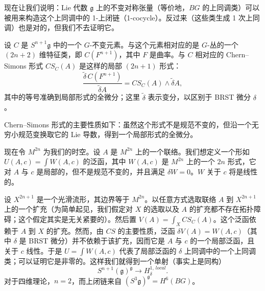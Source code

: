 现在让我们说明：Lie 代数 $\mathfrak g$ 上的不变对称张量（等价地，$BG$ 的上同调类）可以被用来构造这个上同调中的 1-上闭链（1-cocycle）。反过来（这些类生成 1 次上同调）也是对的，但我们不去证明它。

设 $C$ 是 $S^{n+1}\mathfrak g$ 中的一个 $G$-不变元素。与这个元素相对应的是 $G$-丛的一个 $(2n+2)$ 维特征类，即 $C(F^{n+1})$，其中 $F$ 是曲率。与 $C$ 相对应的 Chern–Simons 形式 $CS_C(A)$ 是这样的局部 $(2n+1)$ 形式：
\[
\frac{\widetilde\delta\,C(F^{n+1})}{\widetilde\delta A}=CS_C(A)\wedge\widetilde\delta A,
\]
其中的等号准确到局部形式的全微分；这里 $\widetilde\delta$ 表示变分，以区别于 BRST 微分 $\delta$。

Chern–Simons 形式的主要性质如下：虽然这个形式不是规范不变的，但沿一个无穷小规范变换取它的 Lie 导数，得到一个局部形式的全微分。


现在令 $M^{2n}$ 为我们的时空。设 $A$ 是 $M^{2n}$ 上的一个联络。我们想定义一个形如 $U(A,c)=\int W(A,c)$ 的泛函，其中 $W(A,c)$ 是 $M^{2n}$ 上的一个 $2n$ 形式，它对 $A$ 与 $c$ 是局部的，但不是规范不变的，并且满足 $\delta W=0$。$W$ 关于 $c$ 将是线性的。

设 $X^{2n+1}$ 是一个光滑流形，其边界等于 $M^{2n}$。以任意方式选取联络 $A$ 到 $X^{2n+1}$ 上的一个扩充（为简单起见，我们假定对 $X$ 的选取以及 $A$ 的扩充都不存在拓扑障碍；这个假定其实是无关紧要的）。然后置 $V(A)=\int_X CS_C(A)$。这个泛函依赖于 $A$ 到 $X$ 的扩充。然而，由 $CS$ 的主要性质，泛函 $\delta V(A)=W(A,c)$（其中 $\delta$ 是 BRST 微分）并不依赖于该扩充，因而它是 $A$ 与 $c$ 的一个局部泛函，且关于 $c$ 线性。于是 $U=\int W(A,c)$ 代表了局部泛函的 $\delta$ 上同调中的一个上同调类；可以证明它是非零的。这样我们就得到一个单射（事实上是同构）
\[
S^{n+1}(\mathfrak g)^{\mathfrak g}\longrightarrow H^{1,\,local}_{\delta}.
\]
对于四维理论，$n=2$，而上闭链来自 $(S^3\mathfrak g)^{\mathfrak g}=H^6(BG)$。


